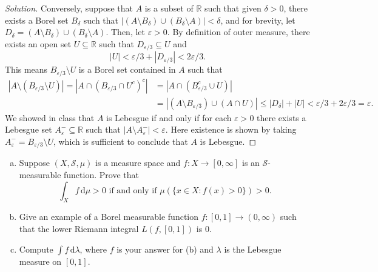 \documentclass[10pt]{article}
\newcommand{\dd}{\,\mathrm{d}}
\providecommand{\eps}{\varepsilon}
\providecommand{\RR}{\mathbb R}
\providecommand{\ii}{\item}
\newenvironment{soln}{\begin{proof}[Solution]}{\end{proof}}
\providecommand{\abs}[1]{\left|#1\right|}
\begin{document}
\begin{soln}
    Conversely, suppose that $A$ is a subset of $\RR$ such that
    given $\delta>0$, there exists a Borel set $B_\delta$ such that
    $\abs{(A\setminus B_\delta)\cup(B_\delta\setminus A)} < \delta$,
    and for brevity, let
    $D_\delta = (A\setminus B_\delta)\cup(B_\delta\setminus A)$.
    Then, let $\eps>0$. By definition of outer measure, there exists
    an open set $U\subseteq\RR$ such that $D_{\eps/3}\subseteq U$ and
    \begin{equation*}
	\abs U < \eps/3 + \abs{D_{\eps/3}} < 2\eps/3.
    \end{equation*}
    This means $B_{\eps/3}\setminus U$ is a Borel set contained in $A$ such that
    \begin{align*}
	\abs{A\setminus(B_{\eps/3}\setminus U)}
	= \abs{A\cap(B_{\eps/3}\cap U^c)^c}
	&= \abs{A\cap(B_{\eps/3}^c\cup U)}\\
	&= \abs{(A\setminus B_{\eps/3})\cup(A\cap U)}
	\le \abs{D_\delta} + \abs{U}
	< \eps/3 + 2\eps/3 = \eps.
    \end{align*}
    We showed in class that $A$ is Lebesgue if and only if
    for each $\eps>0$ there exists a Lebesgue set $A^-_\eps\subseteq\RR$
    such that $\abs{A\setminus A^-_\eps} < \eps$.
    Here existence is shown by taking $A^-_\eps = B_{\eps/3}\setminus U$,
    which is sufficient to conclude that $A$ is Lebesgue.
\end{soln}

\pagebreak

\begin{problem}
    \begin{enumerate}[(a)]
        \ii Suppose $(X,\mathcal S,\mu)$ is a measure space and
	$f\colon X\to[0,\infty]$ is an $\mathcal S$-measurable function.
	Prove that
	\begin{equation*}
	    \int_X f\dd\mu > 0\text{ if and only if }
	    \mu(\{x\in X : f(x) > 0\}) > 0.
	\end{equation*}
	\ii Give an example of a Borel measurable function
	$f\colon[0,1]\to(0,\infty)$ such that
	the lower Riemann integral $L(f,[0,1])$ is $0$.
	\ii Compute $\int f\dd\lambda$,
	where $f$ is your answer for (b) and
	$\lambda$ is the Lebesgue measure on $[0,1]$.
    \end{enumerate}
\end{problem}
\end{document}
